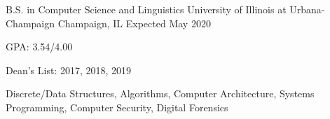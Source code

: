 

\begin{cventries}

  \cventry
    {B.S. in Computer Science and Linguistics} %
    {University of Illinois at Urbana-Champaign} %
    {Champaign, IL} %
    {Expected May 2020} %
    {
      \begin{cvitems} %
        \item {GPA: 3.54/4.00}
        \item {Dean's List: 2017, 2018, 2019}
        \item {Discrete/Data Structures, Algorithms, Computer Architecture, Systems Programming, Computer Security, Digital Forensics}%
      \end{cvitems}
    }

\end{cventries}
